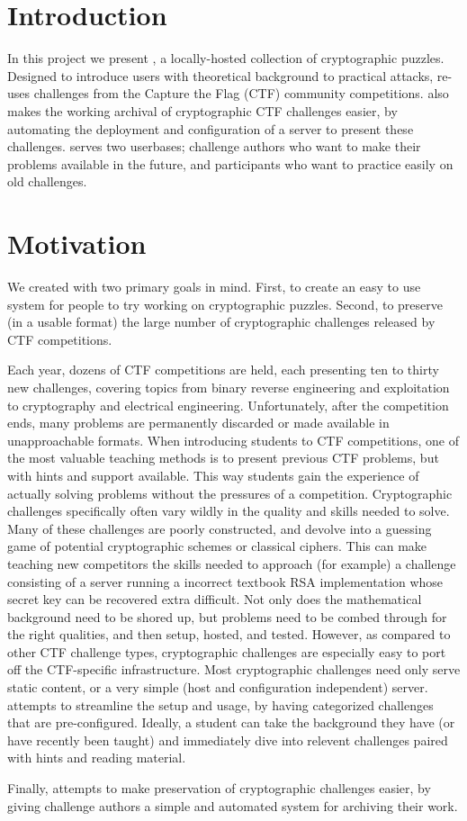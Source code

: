 \section{Introduction}
In this project we present \cvm{}, a locally-hosted collection of
cryptographic puzzles. Designed to introduce users with theoretical
background to practical attacks, \cvm{} re-uses challenges from the
Capture the Flag (CTF)\cite{ctftime:whatisctf} community
competitions. \cvm{} also makes the working archival of cryptographic
CTF challenges easier, by automating the deployment and configuration
of a server to present these challenges. \cvm{} serves two userbases;
challenge authors who want to make their problems available in the
future, and participants who want to practice easily on old
challenges.


\section{Motivation}
We created \cvm{} with two primary goals in mind. First, to create an
easy to use system for people to try working on cryptographic
puzzles. Second, to preserve (in a usable format) the large number of
cryptographic challenges released by CTF competitions.

Each year, dozens of CTF competitions are held, each presenting ten to
thirty new challenges, covering topics from binary reverse engineering
and exploitation to cryptography and electrical
engineering. Unfortunately, after the competition ends, many problems
are permanently discarded or made available in unapproachable
formats. When introducing students to CTF competitions, one of the
most valuable teaching methods is to present previous CTF problems,
but with hints and support available. This way students gain the
experience of actually solving problems without the pressures of a
competition. Cryptographic challenges specifically often vary wildly
in the quality and skills needed to solve. Many of these challenges
are poorly constructed, and devolve into a guessing game of potential
cryptographic schemes or classical ciphers. This can make teaching new
competitors the skills needed to approach (for example) a challenge
consisting of a server running a incorrect textbook RSA implementation
whose secret key can be recovered extra difficult. Not only does the
mathematical background need to be shored up, but problems need to be
combed through for the right qualities, and then setup, hosted, and
tested. However, as compared to other CTF challenge types,
cryptographic challenges are especially easy to port off the
CTF-specific infrastructure. Most cryptographic challenges need only
serve static content, or a very simple (host and configuration
independent) server. \cvm{} attempts to streamline the setup and
usage, by having categorized challenges that are
pre-configured. Ideally, a student can take the background they have
(or have recently been taught) and immediately dive into relevent
challenges paired with hints and reading material.

Finally, \cvm{} attempts to make preservation of cryptographic
challenges easier, by giving challenge authors a simple and automated
system for archiving their work.
